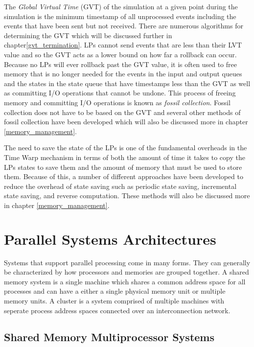 \documentclass[11pt]{book}
\begin{document}
The \emph{Global Virtual Time} (GVT) of the simulation at a given point during the simulation
is the minimum timestamp of all unprocessed events including the events that have been
sent but not received\cite{jefferson-85}.  There are numerous algorithms for determining
the GVT which will be discussed further in chapter\ref{gvt_termination}.  LPs cannot send
events that are less than their LVT value and so the GVT acts as a lower bound on how far
a rollback can occur.  Because no LPs will ever rollback past the GVT value, it is often
used to free memory that is no longer needed for the events in the input and output queues
and the states in the state queue that have timestamps less than the GVT as well as committing
I/O operations that cannot be undone.  This process of freeing memory and committing I/O
operations is known as \emph{fossil collection}.  Fossil collection does not have to be based
on the GVT and several other methods of fossil collection have been developed which will
also be discussed more in chapter \ref{memory_management}.

The need to save the state of the LPs is one of the fundamental overheads in the Time Warp
mechanism in terms of both the amount of time it takes to copy the LPs states to save them
and the amount of memory that must be used to store them.  Because of this, a number of
different approaches have been developed to reduce the overhead of state saving such as
periodic state saving, incremental state saving, and reverse computation.  These methods
will also be discussed more in chapter \ref{memory_management}.

\section{Parallel Systems Architectures}

Systems that support parallel processing come in many forms.  They can generally be characterized
by how processors and memories are grouped together.  A shared memory system is a single machine
which shares a common address space for all processes and can have a either a single physical
memory unit or multiple memory units.  A cluster is a system comprised of multiple machines with
seperate process address spaces connected over an interconnection network.

\subsection{Shared Memory Multiprocessor Systems}
\end{document}
